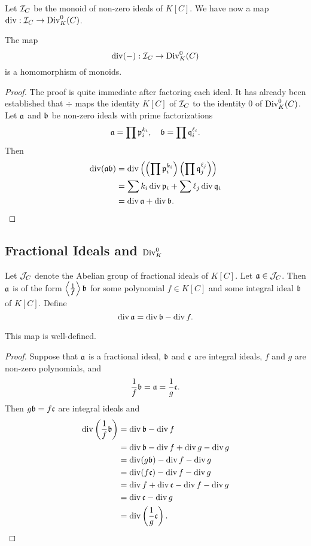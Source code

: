 Let $\cal I_C$ be the monoid of non-zero ideals of $K[C]$.
We have now a map $\div : \cal I_C \to \Div_K^0(C)$.
\begin{theorem}
  The map
    \[ \div(-) : \cal I_C \to \Div_K^0(C) \]
  is a homomorphism of monoids.
\end{theorem}
\begin{proof}
  The proof is quite immediate after factoring each ideal.
  It has already been established that $\div$ maps the identity $K[C]$ of $\cal I_C$ to the identity $0$ of $\Div_K^0(C)$.
  Let $\frak a$ and $\frak b$ be non-zero ideals with prime factorizations
  \[ \frak a = \prod \frak p_i^{k_i}, ~~~ \frak b = \prod \frak q_i^{\ell_i}. \]
  Then
  \begin{align*}
    \div (\frak a \frak b)
      &= \div \left( \left( \prod \frak p_i^{k_i} \right) \left( \prod \frak q_j^{\ell_j} \right) \right) \\
      &= \sum k_i \div \frak p_i + \sum \ell_j \div \frak q_i \\
      &= \div \frak a + \div \frak b.
  \end{align*}
\end{proof}



\subsection{Fractional Ideals and $\Div_K^0$}



Let $\cal J_C$ denote the Abelian group of fractional ideals of $K[C]$.
Let $\frak a \in \cal J_C$.
Then $\frak a$ is of the form $\pid{\frac 1 f} \frak b$ for some polynomial $f \in K[C]$ and some integral ideal $\frak b$ of $K[C]$.
Define
\[ \div \frak a = \div \frak b - \div f. \]

\begin{proposition}
  This map is well-defined.
\end{proposition}
\begin{proof}
  Suppose that $\frak a$ is a fractional ideal,
  $\frak b$ and $\frak c$ are integral ideals,
  $f$ and $g$ are non-zero polynomials, and
    \[ \frac 1 f \frak b = \frak a = \frac 1 g \frak c. \]
  Then $g \frak b = f \frak c$ are integral ideals and
  \begin{align*}
    \div \left( \frac 1 f \frak b \right)
      &= \div \frak b - \div f \\
      &= \div \frak b - \div f + \div g - \div g \\
      &= \div (g \frak b) - \div f - \div g \\
      &= \div (f \frak c) - \div f - \div g \\
      &= \div f + \div \frak c - \div f - \div g \\
      &= \div \frak c - \div g \\
      &= \div \left( \frac 1 g \frak c \right).
  \end{align*}
\end{proof}

